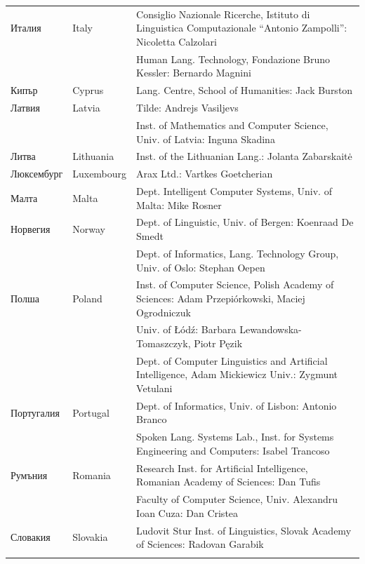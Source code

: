 \begin{longtable}{llp{105mm}}
Италия & \textcolor{grey1}{Italy} & Consiglio Nazionale Ricerche, Istituto di Linguistica Computazionale “Antonio Zampolli”: Nicoletta Calzolari\\ \addlinespace  & & Human Lang. Technology, Fondazione Bruno Kessler: Bernardo Magnini\\ \addlinespace 
Кипър & \textcolor{grey1}{Cyprus} & Lang. Centre, School of Humanities: Jack Burston \\ \addlinespace 
Латвия & \textcolor{grey1}{Latvia} & Tilde: Andrejs Vasiljevs\\ \addlinespace & & Inst. of Mathematics and Computer Science, Univ. of Latvia: Inguna Skadina\\ \addlinespace
Литва & \textcolor{grey1}{Lithuania} & Inst. of the Lithuanian Lang.: Jolanta Zabarskaitė\\ \addlinespace
Люксембург & \textcolor{grey1}{Luxembourg} & Arax Ltd.: Vartkes Goetcherian\\ \addlinespace
Малта & \textcolor{grey1}{Malta} & Dept. Intelligent Computer Systems, Univ. of Malta: Mike Rosner\\ \addlinespace
Норвегия & \textcolor{grey1}{Norway} & Dept. of Linguistic, Univ. of Bergen: Koenraad De Smedt\\ \addlinespace & & Dept. of Informatics, Lang. Technology Group, Univ. of Oslo: Stephan Oepen \\ \addlinespace
Полша & \textcolor{grey1}{Poland} & Inst. of Computer Science, Polish Academy of Sciences: Adam Przepiórkowski, Maciej Ogrodniczuk \\ \addlinespace & & Univ. of Łódź: Barbara Lewandowska-Tomaszczyk, Piotr Pęzik\\ \addlinespace  & & Dept. of Computer Linguistics and Artificial Intelligence, Adam Mickiewicz Univ.: Zygmunt Vetulani \\ \addlinespace
Португалия & \textcolor{grey1}{Portugal} & Dept. of Informatics, Univ. of Lisbon: Antonio Branco\\ \addlinespace  & & Spoken Lang. Systems Lab., Inst. for Systems Engineering and Computers: Isabel Trancoso \\ \addlinespace
Румъния & \textcolor{grey1}{Romania} & Research Inst. for Artificial Intelligence, Romanian Academy of Sciences: Dan Tufis \\ \addlinespace  & & Faculty of Computer Science, Univ. Alexandru Ioan Cuza: Dan Cristea \\ \addlinespace
Словакия & \textcolor{grey1}{Slovakia} & Ludovit Stur Inst. of Linguistics, Slovak Academy of Sciences: Radovan Garabik \\ \addlinespace 

\end{longtable}
